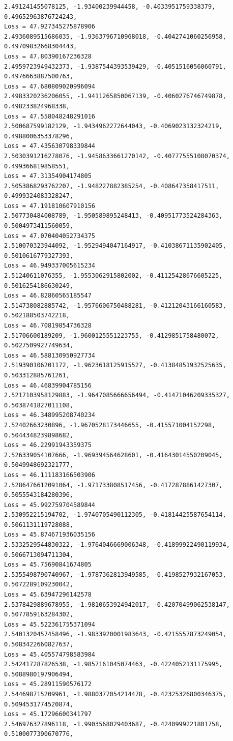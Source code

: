 \documentclass[11pt]{article}
\begin{document}
\begin{Verbatim}[commandchars=\\\{\}]
2.491241455078125, -1.93400239944458, -0.4033951759338379, 0.49652963876724243,
Loss = 47.927345275878906
2.4936089515686035, -1.9363796710968018, -0.4042741060256958,
0.49709832668304443,
Loss = 47.80390167236328
2.4959723949432373, -1.9387544393539429, -0.4051516056060791,
0.4976663887500763,
Loss = 47.680809020996094
2.4983320236206055, -1.9411265850067139, -0.4060276746749878, 0.498233824968338,
Loss = 47.558048248291016
2.500687599182129, -1.9434962272644043, -0.4069023132324219, 0.4988006353378296,
Loss = 47.435630798339844
2.5030391216278076, -1.9458633661270142, -0.40777555108070374,
0.499366819858551,
Loss = 47.31354904174805
2.5053868293762207, -1.948227882385254, -0.408647358417511, 0.4999324083328247,
Loss = 47.191810607910156
2.507730484008789, -1.950589895248413, -0.40951773524284363, 0.5004973411560059,
Loss = 47.070404052734375
2.510070323944092, -1.9529494047164917, -0.41038671135902405,
0.5010616779327393,
Loss = 46.949337005615234
2.51240611076355, -1.9553062915802002, -0.41125428676605225, 0.5016254186630249,
Loss = 46.82860565185547
2.514738082885742, -1.9576606750488281, -0.41212043166160583, 0.502188503742218,
Loss = 46.70819854736328
2.51706600189209, -1.9600125551223755, -0.4129851758480072, 0.5027509927749634,
Loss = 46.588130950927734
2.519390106201172, -1.9623618125915527, -0.41384851932525635, 0.503312885761261,
Loss = 46.46839904785156
2.5217103958129883, -1.9647085666656494, -0.41471046209335327,
0.5038741827011108,
Loss = 46.348995208740234
2.52402663230896, -1.9670528173446655, -0.415571004152298, 0.5044348239898682,
Loss = 46.22991943359375
2.526339054107666, -1.969394564628601, -0.41643014550209045, 0.5049948692321777,
Loss = 46.111183166503906
2.5286476612091064, -1.971733808517456, -0.4172878861427307, 0.5055543184280396,
Loss = 45.992759704589844
2.530952215194702, -1.9740705490112305, -0.41814425587654114,
0.5061131119728088,
Loss = 45.874671936035156
2.5332529544830322, -1.9764046669006348, -0.41899922490119934,
0.5066713094711304,
Loss = 45.75690841674805
2.5355498790740967, -1.9787362813949585, -0.4198527932167053,
0.5072289109230042,
Loss = 45.63947296142578
2.5378429889678955, -1.9810653924942017, -0.42070499062538147,
0.5077859163284302,
Loss = 45.522361755371094
2.5401320457458496, -1.9833920001983643, -0.4215557873249054,
0.5083422660827637,
Loss = 45.405574798583984
2.542417287826538, -1.9857161045074463, -0.4224052131175995, 0.5088980197906494,
Loss = 45.28911590576172
2.544698715209961, -1.9880377054214478, -0.42325326800346375,
0.5094531774520874,
Loss = 45.17296600341797
2.546976327896118, -1.9903568029403687, -0.4240999221801758, 0.5100077390670776,

\end{Verbatim}
\end{document}
